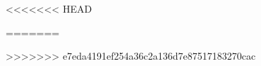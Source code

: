 \documentclass[preprint,12pt,authoryear]{elsarticle}
\begin{document}









<<<<<<< HEAD

=======

>>>>>>> e7eda4191ef254a36c2a136d7e87517183270cac


\end{document}
